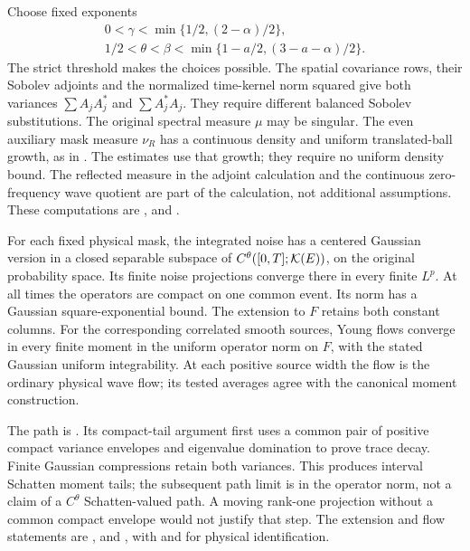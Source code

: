 Choose fixed exponents
\begin{equation}\label{E:reader-path-window}
  \begin{gathered}
    0<\gamma<\min\{1/2,(2-\alpha)/2\},\\
    1/2<\theta<\beta<\min\{1-a/2,(3-a-\alpha)/2\}.
  \end{gathered}
\end{equation}
The strict threshold makes the choices possible. The spatial covariance rows,
their Sobolev adjoints and the normalized time-kernel norm squared give both
variances $\sum A_jA_j^*$ and $\sum A_j^*A_j$. They require different balanced
Sobolev substitutions. The original spectral measure $\mu$ may be singular. The
even auxiliary mask measure $\nu_R$ has a continuous density and uniform
translated-ball growth, as in . The
estimates use that growth; they require no uniform density bound. The reflected
measure in the adjoint calculation and the continuous zero-frequency wave
quotient are part of the calculation, not additional assumptions. These
computations are ,
 and .

\begin{lemma}\label{L:reader-path}
  For each fixed physical mask, the integrated noise has a centered Gaussian
  version in a closed separable subspace of $C^\theta([0,T];\mathcal K(E))$, on the
  original probability space. Its finite noise projections converge there in
  every finite $L^p$. At all times the operators are compact on one common
  event. Its norm has a Gaussian square-exponential bound. The extension to $F$
  retains both constant columns. For the corresponding correlated smooth
  sources, Young flows converge in every finite moment in the uniform operator
  norm on $F$, with the stated Gaussian uniform integrability. At each positive
  source width the flow is the ordinary physical wave flow; its tested averages
  agree with the canonical moment construction.
\end{lemma}

The path is . Its compact-tail
argument first uses a common pair of positive compact variance envelopes and
eigenvalue domination to prove trace decay. Finite Gaussian compressions retain
both variances. This produces interval Schatten moment tails; the subsequent
path limit is in the operator norm, not a claim of a $C^\theta$ Schatten-valued
path. A moving rank-one projection without a common compact envelope would not
justify that step. The extension and flow statements are
,  and
, with 
and  for physical identification.

